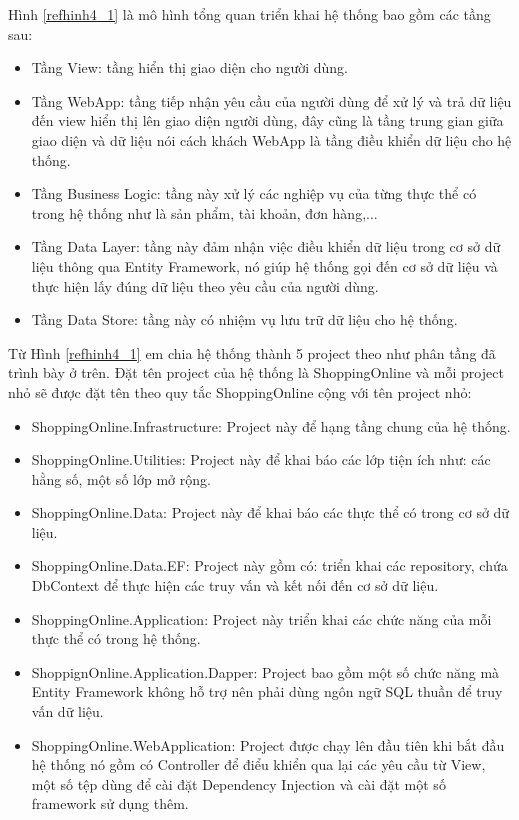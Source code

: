 \par
Hình \ref{refhinh4_1} là mô hình tổng quan triển khai hệ thống bao gồm các tầng sau:
\begin{itemize}
\item Tầng View: tầng hiển thị giao diện cho người dùng.
\item Tầng WebApp: tầng tiếp nhận yêu cầu của người dùng để xử lý và trả dữ liệu đến view hiển thị lên giao diện người dùng, đây cũng là tầng trung gian giữa giao diện và dữ liệu nói cách khách WebApp là tầng điều khiển dữ liệu cho hệ thống.
\item Tầng Business Logic: tầng này xử lý các nghiệp vụ của từng thực thể có trong hệ thống như là sản phẩm, tài khoản, đơn hàng,...
\item Tầng Data Layer: tầng này đảm nhận việc điều khiển dữ liệu trong cơ sở dữ liệu thông qua Entity Framework, nó giúp hệ thống gọi đến cơ sở dữ liệu và thực hiện lấy đúng dữ liệu theo yêu cầu của người dùng.
\item Tầng Data Store: tầng này có nhiệm vụ lưu trữ dữ liệu cho hệ thống.
\end{itemize}
\par
Từ Hình \ref{refhinh4_1} em chia hệ thống thành 5 project theo như phân tầng đã trình bày ở trên. Đặt tên project của hệ thống là ShoppingOnline và mỗi project nhỏ sẽ được đặt tên theo quy tắc ShoppingOnline cộng với tên project nhỏ:
\begin{itemize}
\item ShoppingOnline.Infrastructure: Project này để hạng tầng chung của hệ thống.
\item ShoppingOnline.Utilities: Project này để khai báo các lớp tiện ích như: các hằng số, một số lớp mở rộng.
\item ShoppingOnline.Data: Project này để khai báo các thực thể có trong cơ sở dữ liệu.
\item ShoppingOnline.Data.EF: Project này gồm có: triển khai các repository, chứa DbContext  để thực hiện các truy vấn và kết nối đến cơ sở dữ liệu.
\item ShoppingOnline.Application: Project này triển khai các chức năng của mỗi thực thể có trong hệ thống.
\item ShoppignOnline.Application.Dapper: Project bao gồm một số chức năng mà Entity Framework không hỗ trợ nên phải dùng ngôn ngữ SQL thuần để truy vấn dữ liệu.
\item ShoppingOnline.WebApplication: Project được chạy lên đầu tiên khi bắt đầu hệ thống nó gồm có Controller để điểu khiển qua lại các yêu cầu từ View, một số tệp dùng để cài đặt Dependency Injection và cài đặt một số framework sử dụng thêm. 
\end{itemize}

